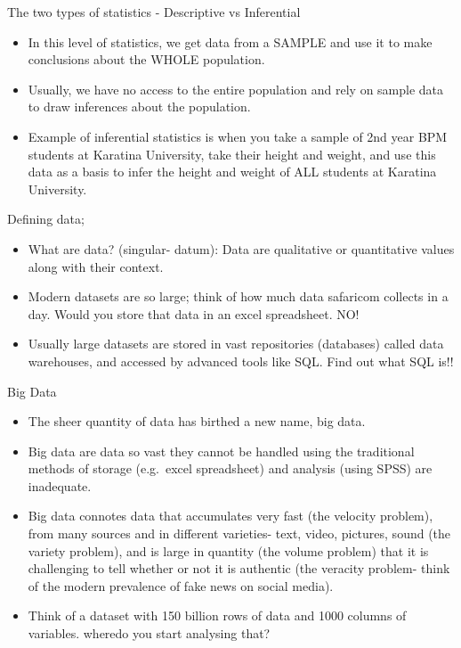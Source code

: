 \documentclass[
  ignorenonframetext,
]{beamer}
\begin{document}
\begin{frame}{The two types of statistics - Descriptive vs Inferential}
\protect\hypertarget{the-two-types-of-statistics---descriptive-vs-inferential-1}{}
\begin{itemize}
\item
  In this level of statistics, we get data from a SAMPLE and use it to
  make conclusions about the WHOLE population.
\item
  Usually, we have no access to the entire population and rely on sample
  data to draw inferences about the population.
\item
  Example of inferential statistics is when you take a sample of 2nd
  year BPM students at Karatina University, take their height and
  weight, and use this data as a basis to infer the height and weight of
  ALL students at Karatina University.
\end{itemize}
\end{frame}

\begin{frame}{Defining data;}
\protect\hypertarget{defining-data}{}
\begin{itemize}
\item
  What are data? (singular- datum): Data are qualitative or quantitative
  values along with their context.
\item
  Modern datasets are so large; think of how much data safaricom
  collects in a day. Would you store that data in an excel spreadsheet.
  NO!
\item
  Usually large datasets are stored in vast repositories (databases)
  called data warehouses, and accessed by advanced tools like SQL. Find
  out what SQL is!!
\end{itemize}
\end{frame}

\begin{frame}{Big Data}
\protect\hypertarget{big-data}{}
\begin{itemize}
\item
  The sheer quantity of data has birthed a new name, big data.
\item
  Big data are data so vast they cannot be handled using the traditional
  methods of storage (e.g.~excel spreadsheet) and analysis (using SPSS)
  are inadequate.
\item
  Big data connotes data that accumulates very fast (the velocity
  problem), from many sources and in different varieties- text, video,
  pictures, sound (the variety problem), and is large in quantity (the
  volume problem) that it is challenging to tell whether or not it is
  authentic (the veracity problem- think of the modern prevalence of
  fake news on social media).
\item
  Think of a dataset with 150 billion rows of data and 1000 columns of
  variables. wheredo you start analysing that?
\end{itemize}
\end{frame}
\end{document}
